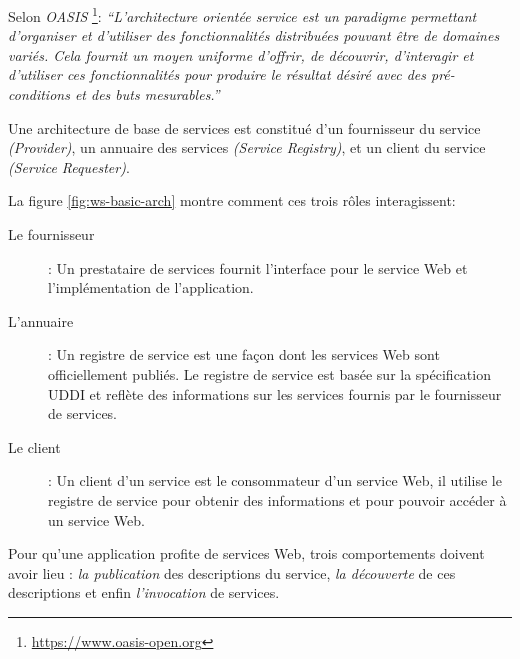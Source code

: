   Selon \textit{OASIS} \footnote{\url{https://www.oasis-open.org}}:
  \textit{``L'architecture orientée service est un paradigme
    permettant d'organiser et d'utiliser des fonctionnalités
    distribuées pouvant être de domaines variés. Cela fournit un moyen
    uniforme d'offrir, de découvrir, d'interagir et d'utiliser ces
    fonctionnalités pour produire le résultat désiré avec des
    pré-conditions et des buts mesurables.''}\bigskip

  Une architecture de base de services
  \cite{gottschalk2002introduction} est constitué d'un fournisseur du
  service \textit{(Provider)}, un annuaire des services
  \textit{(Service Registry)}, et un client du service
  \textit{(Service Requester)}.

  


  La figure \ref{fig:ws-basic-arch} montre comment ces trois rôles
  interagissent:

  \renewcommand{\descriptionlabel}[1]{\hspace{0.5cm}\textbullet~\textsf{#1}}
  \begin{description}
  \item[Le fournisseur]: Un prestataire de services fournit
    l'interface pour le service Web et l'implémentation de
    l'application.

  \item[L'annuaire]: Un registre de service est une façon dont les
    services Web sont officiellement publiés. Le registre de service
    est basée sur la spécification \textsc{UDDI} et reflète des
    informations sur les services fournis par le fournisseur de
    services.

  \item[Le client]: Un client d'un service est le consommateur d'un
    service Web, il utilise le registre de service pour obtenir des
    informations et pour pouvoir accéder à un service Web.
  \end{description}

  Pour qu'une application profite de services Web, trois comportements
  doivent avoir lieu : \textit{la publication} des descriptions du
  service, \textit{la découverte} de ces descriptions et enfin
  \textit{l'invocation} de services.

